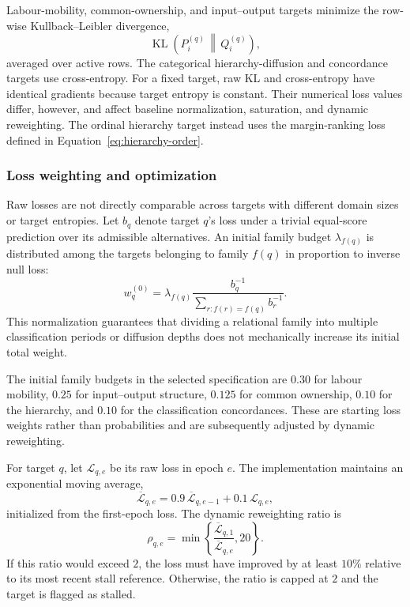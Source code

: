 \documentclass[9pt,twoside]{pnas-new}
\begin{document}
Labour-mobility, common-ownership, and input--output targets minimize the
row-wise Kullback--Leibler divergence,
\begin{equation}
\operatorname{KL}
\left(
P^{(q)}_i \,\middle\|\, Q^{(q)}_i
\right),
\end{equation}
averaged over active rows. The categorical hierarchy-diffusion and concordance
targets use cross-entropy. For a fixed target, raw KL and cross-entropy have identical gradients because target entropy is constant. Their numerical loss values differ, however, and affect baseline normalization, saturation, and dynamic reweighting. The ordinal hierarchy target instead uses the
margin-ranking loss defined in Equation~\eqref{eq:hierarchy-order}.

\subsubsection{Loss weighting and optimization}
\label{subsubsec:loss-weighting}

Raw losses are not directly comparable across targets with different domain
sizes or target entropies. Let \(b_q\) denote target \(q\)'s loss under a
trivial equal-score prediction over its admissible alternatives. An initial
family budget \(\lambda_{f(q)}\) is distributed among the targets belonging
to family \(f(q)\) in proportion to inverse null loss:
\begin{equation}
w^{(0)}_q
=
\lambda_{f(q)}
\frac{
b_q^{-1}
}{
\sum_{r:f(r)=f(q)}b_r^{-1}
}.
\label{eq:target-weight}
\end{equation}
This normalization guarantees that dividing a relational family into
multiple classification periods or diffusion depths does not mechanically
increase its initial total weight.

The initial family budgets in the selected specification are \(0.30\) for
labour mobility, \(0.25\) for input--output structure, \(0.125\) for common
ownership, \(0.10\) for the hierarchy, and \(0.10\) for the classification
concordances. These are starting loss weights rather than probabilities and
are subsequently adjusted by dynamic reweighting.

For target \(q\), let \(\mathcal{L}_{q,e}\) be its raw loss in epoch \(e\).
The implementation maintains an exponential moving average,
\begin{equation}
\overline{\mathcal{L}}_{q,e}
=
0.9\,
\overline{\mathcal{L}}_{q,e-1}
+
0.1\,
\mathcal{L}_{q,e},
\label{eq:loss-ema}
\end{equation}
initialized from the first-epoch loss. The dynamic reweighting ratio is
\begin{equation}
\rho_{q,e}
=
\min\left\{
\frac{
\overline{\mathcal{L}}_{q,1}
}{
\overline{\mathcal{L}}_{q,e}
},
20
\right\}.
\label{eq:dynamic-reweight}
\end{equation}
If this ratio would exceed \(2\), the loss must have improved by at least
\(10\%\) relative to its most recent stall reference. Otherwise, the ratio is
capped at \(2\) and the target is flagged as stalled.
\end{document}
